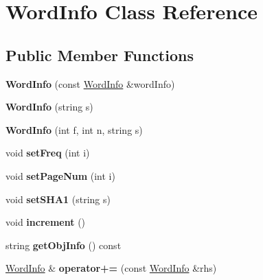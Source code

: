 \hypertarget{class_word_info}{\section{Word\+Info Class Reference}
\label{class_word_info}
}
\subsection*{Public Member Functions}
\begin{DoxyCompactItemize}
\item 
\hypertarget{class_word_info_af7a9b9d57364ecdfbfb57e75bdba892b}{{\bfseries Word\+Info} (const \hyperlink{class_word_info}{Word\+Info} \&word\+Info)}\label{class_word_info_af7a9b9d57364ecdfbfb57e75bdba892b}

\item 
\hypertarget{class_word_info_a35939caf471e57448e70c4f5b03f6029}{{\bfseries Word\+Info} (string s)}\label{class_word_info_a35939caf471e57448e70c4f5b03f6029}

\item 
\hypertarget{class_word_info_abd1c765dd61733c197611f4dcc85836c}{{\bfseries Word\+Info} (int f, int n, string s)}\label{class_word_info_abd1c765dd61733c197611f4dcc85836c}

\item 
\hypertarget{class_word_info_af2ee9869a097d5ef78a551f79f99ee39}{void {\bfseries set\+Freq} (int i)}\label{class_word_info_af2ee9869a097d5ef78a551f79f99ee39}

\item 
\hypertarget{class_word_info_adaacce5cd71311322732f1089026b281}{void {\bfseries set\+Page\+Num} (int i)}\label{class_word_info_adaacce5cd71311322732f1089026b281}

\item 
\hypertarget{class_word_info_a68f673ad022ff19bc86b1521bdbb536f}{void {\bfseries set\+S\+H\+A1} (string s)}\label{class_word_info_a68f673ad022ff19bc86b1521bdbb536f}

\item 
\hypertarget{class_word_info_a160c795ff8b17299525581c4b4bb65d6}{void {\bfseries increment} ()}\label{class_word_info_a160c795ff8b17299525581c4b4bb65d6}

\item 
\hypertarget{class_word_info_a2a40070a68e6cfbb3e3087c6642ac86c}{string {\bfseries get\+Obj\+Info} () const }\label{class_word_info_a2a40070a68e6cfbb3e3087c6642ac86c}

\item 
\hypertarget{class_word_info_ac4313e54d4d90e6e3a90a22e7e27c289}{\hyperlink{class_word_info}{Word\+Info} \& {\bfseries operator+=} (const \hyperlink{class_word_info}{Word\+Info} \&rhs)}\label{class_word_info_ac4313e54d4d90e6e3a90a22e7e27c289}

\end{DoxyCompactItemize}

